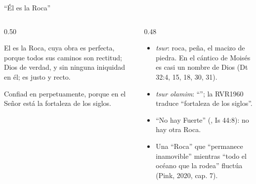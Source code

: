 \begin{frame}{``Él es la Roca''}
\begin{columns}[t,onlytextwidth]
\begin{column}{0.50\textwidth}
\begin{cita}El es la Roca, cuya obra es perfecta, porque todos sus caminos son rectitud; Dios de verdad, y sin ninguna iniquidad en él; es justo y recto.\end{cita}
\begin{cita}Confiad en \SENOR{} perpetuamente, porque en \SENOR{} el Señor está la fortaleza de los siglos.\end{cita}
\begin{center}\end{center}
\end{column}
\begin{column}{0.48\textwidth}\small
\begin{itemize}
\item {} \emph{tsur}: roca, peña, el macizo de piedra. En el cántico de Moisés es casi un nombre de Dios (Dt 32:4, 15, 18, 30, 31).
\item {} \emph{tsur olamim}: ``''; la RVR1960 traduce ``fortaleza de los siglos''.
\item ``No hay Fuerte'' (, Is 44:8): no hay otra Roca.
\item Una ``Roca'' que ``permanece inamovible'' mientras ``todo el océano que la rodea'' fluctúa (Pink, 2020, cap. 7).
\end{itemize}
\end{column}
\end{columns}
\end{frame}

